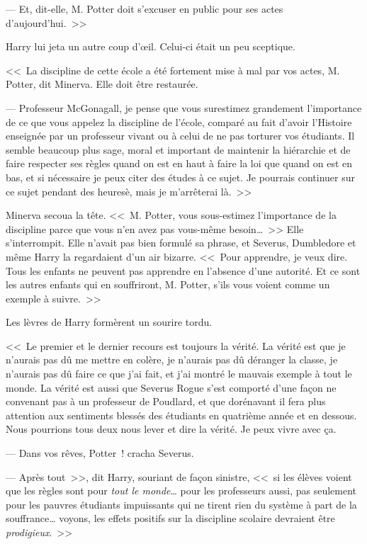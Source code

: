 --- Et, dit-elle, M. Potter doit s'excuser en public pour ses actes d'aujourd'hui.~>>

Harry lui jeta un autre coup d'œil. Celui-ci était un peu sceptique.

<<~La discipline de cette école a été fortement mise à mal par vos actes, M. Potter, dit Minerva. Elle doit être restaurée.

--- Professeur McGonagall, je pense que vous surestimez grandement l'importance de ce que vous appelez la discipline de l'école, comparé au fait d'avoir l'Histoire enseignée par un professeur vivant ou à celui de ne pas torturer vos étudiants. Il semble beaucoup plus sage, moral et important de maintenir la hiérarchie et de faire respecter ses règles quand on est en haut à faire la loi que quand on est en bas, et si nécessaire je peux citer des études à ce sujet. Je pourrais continuer sur ce sujet pendant des heuresè, mais je m'arrêterai là.~>>

Minerva secoua la tête. <<~M. Potter, vous sous-estimez l'importance de la discipline parce que vous n'en avez pas vous-même besoin…~>> Elle s'interrompit. Elle n'avait pas bien formulé sa phrase, et Severus, Dumbledore et même Harry la regardaient d'un air bizarre. <<~Pour apprendre, je veux dire. Tous les enfants ne peuvent pas apprendre en l'absence d'une autorité. Et ce sont les autres enfants qui en souffriront, M. Potter, s'ils vous voient comme un exemple à suivre.~>>

Les lèvres de Harry formèrent un sourire tordu.

<<~Le premier et le dernier recours est toujours la vérité. La vérité est que je n'aurais pas dû me mettre en colère, je n'aurais pas dû déranger la classe, je n'aurais pas dû faire ce que j'ai fait, et j'ai montré le mauvais exemple à tout le monde. La vérité est aussi que Severus Rogue s'est comporté d'une façon ne convenant pas à un professeur de Poudlard, et que dorénavant il fera plus attention aux sentiments blessés des étudiants en quatrième année et en dessous. Nous pourrions tous deux nous lever et dire la vérité. Je peux vivre avec ça.

--- Dans vos rêves, Potter~! cracha Severus.

--- Après tout~>>, dit Harry, souriant de façon sinistre, <<~si les élèves voient que les règles sont pour \emph{tout le monde}… pour les professeurs aussi, pas seulement pour les pauvres étudiants impuissants qui ne tirent rien du système à part de la souffrance… voyons, les effets positifs sur la discipline scolaire devraient être \emph{prodigieux}.~>>

